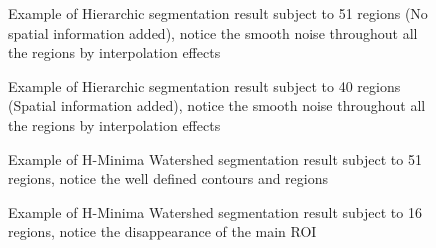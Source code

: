 \documentclass[10pt,twocolumn,letterpaper]{article}
\begin{document}
\begin{figure}[H]
	\centering
	\caption{Example of Hierarchic segmentation result subject to 51 regions (No spatial information added), notice the smooth noise throughout all the regions by interpolation effects}
	\label{Fig:hier1}
\end{figure}

\begin{figure}[H]
	\centering
	\caption{Example of Hierarchic segmentation result subject to 40 regions (Spatial information added), notice the smooth noise throughout all the regions by interpolation effects}
	\label{Fig:hier2}
\end{figure}

\begin{figure}[H]
	\centering
	\caption{Example of H-Minima Watershed segmentation result subject to 51 regions, notice the well defined contours and regions}
	\label{Fig:water1}
\end{figure}

\begin{figure}[H]
	\centering
	\caption{Example of H-Minima Watershed segmentation result subject to 16 regions, notice the disappearance of the main ROI}
	\label{Fig:water2}
\end{figure}
\end{document}
